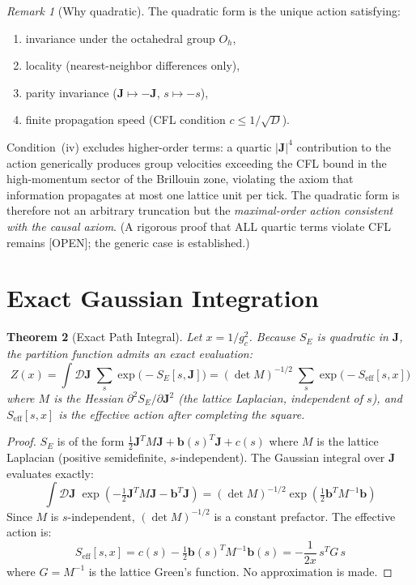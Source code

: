 \documentclass[12pt]{article}
\newtheorem{theorem}{Theorem}[section]
\theoremstyle{definition}
\theoremstyle{remark}
\newtheorem{remark}[theorem]{Remark}
\begin{document}
\begin{remark}[Why quadratic]
\label{rmk:why-quadratic}
The quadratic form is the unique action satisfying:
\begin{enumerate}[nosep]
    \item invariance under the octahedral group $O_h$,
    \item locality (nearest-neighbor differences only),
    \item parity invariance ($\mathbf{J} \mapsto -\mathbf{J}$, $s \mapsto -s$),
    \item finite propagation speed (CFL condition $c \leq 1/\sqrt{D}$).
\end{enumerate}
Condition~(iv) excludes higher-order terms: a quartic $|\mathbf{J}|^4$ contribution to the action generically produces group velocities exceeding the CFL bound in the high-momentum sector of the Brillouin zone, violating the axiom that information propagates at most one lattice unit per tick. The quadratic form is therefore not an arbitrary truncation but the \emph{maximal-order action consistent with the causal axiom}. (A rigorous proof that ALL quartic terms violate CFL remains [OPEN]; the generic case is established.)
\end{remark}

\section{Exact Gaussian Integration}
\label{sec:gaussian}

\begin{theorem}[Exact Path Integral]
\label{thm:gaussian}
Let $x = 1/g_c^2$. Because $S_E$ is quadratic in $\mathbf{J}$, the partition function admits an exact evaluation:
\begin{equation}
    Z(x) = \int \mathcal{D}\mathbf{J}\;\sum_s \exp\!\big(-S_E[s, \mathbf{J}]\big) = (\det M)^{-1/2}\;\sum_s \exp\!\big(-S_{\mathrm{eff}}[s, x]\big)
    \label{eq:Z}
\end{equation}
where $M$ is the Hessian $\partial^2 S_E / \partial \mathbf{J}^2$ (the lattice Laplacian, independent of $s$), and $S_{\mathrm{eff}}[s, x]$ is the effective action after completing the square.
\end{theorem}

\begin{proof}
$S_E$ is of the form $\frac{1}{2}\mathbf{J}^T M \mathbf{J} + \mathbf{b}(s)^T \mathbf{J} + c(s)$ where $M$ is the lattice Laplacian (positive semidefinite, $s$-independent). The Gaussian integral over $\mathbf{J}$ evaluates exactly:
\[
    \int \mathcal{D}\mathbf{J}\;\exp\!\left(-\tfrac{1}{2}\mathbf{J}^T M \mathbf{J} - \mathbf{b}^T \mathbf{J}\right) = (\det M)^{-1/2}\exp\!\left(\tfrac{1}{2}\mathbf{b}^T M^{-1}\mathbf{b}\right)
\]
Since $M$ is $s$-independent, $(\det M)^{-1/2}$ is a constant prefactor. The effective action is:
\[
    S_{\mathrm{eff}}[s, x] = c(s) - \tfrac{1}{2}\mathbf{b}(s)^T M^{-1}\mathbf{b}(s) = -\frac{1}{2x}\,s^T G\,s
\]
where $G = M^{-1}$ is the lattice Green's function. No approximation is made. \qedhere
\end{proof}
\end{document}
